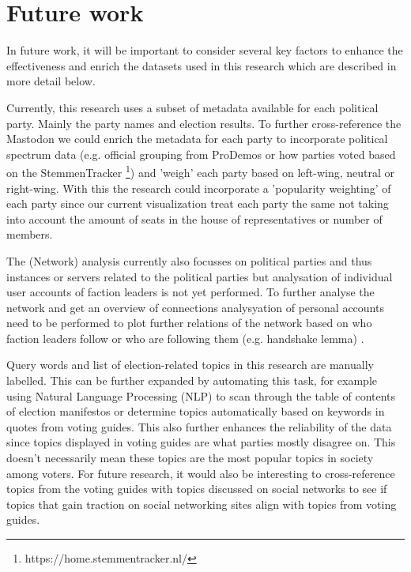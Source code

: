 \section{Future work}

In future work, it will be important to consider several key factors to enhance the effectiveness and enrich the datasets used in this research which are described in more detail below.

Currently, this research uses a subset of metadata available for each political party. Mainly the party names and election results. To further cross-reference the Mastodon we could enrich the metadata for each party to incorporate political spectrum data (e.g. official grouping from ProDemos or how parties voted based on the StemmenTracker \footnote{https://home.stemmentracker.nl/}) and 'weigh' each party based on left-wing, neutral or right-wing. With this the research could incorporate a 'popularity weighting' of each party since our current visualization treat each party the same not taking into account the amount of seats in the house of representatives or number of members.

The (Network) analysis currently also focusses on political parties and thus instances or servers related to the political parties but analysation of individual user accounts of faction leaders is not yet performed. To further analyse the network and get an overview of connections analysyation of personal accounts need to be performed to plot further relations of the network based on who faction leaders follow or who are following them  (e.g. handshake lemma) \cite{handshake}.

Query words and list of election-related topics in this research are manually labelled. This can be further expanded by automating this task, for example using Natural Language Processing (NLP) to scan through the table of contents of election manifestos or determine topics automatically based on keywords in quotes from voting guides. This also further enhances the reliability of the data since topics displayed in voting guides are what parties mostly disagree on. This doesn't necessarily mean these topics are the most popular topics in society among voters. For future research, it would also be interesting to cross-reference topics from the voting guides with topics discussed on social networks to see if topics that gain traction on social networking sites align with topics from voting guides.